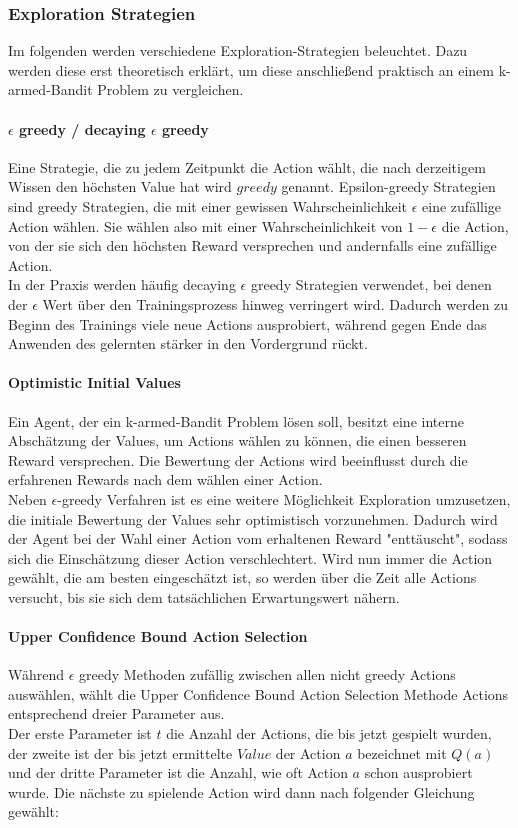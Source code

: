 \documentclass[11pt]{scrartcl}
\begin{document}
\subsubsection{Exploration Strategien}
Im folgenden werden verschiedene Exploration-Strategien beleuchtet. Dazu werden diese erst
theoretisch erklärt, um diese anschließend praktisch an einem k-armed-Bandit Problem zu
vergleichen.

\paragraph{$\epsilon$ greedy / decaying $\epsilon$ greedy}
Eine Strategie, die zu jedem Zeitpunkt die Action wählt, die nach derzeitigem Wissen den
höchsten Value hat wird $greedy$ genannt. Epsilon-greedy Strategien sind greedy
Strategien, die mit einer gewissen Wahrscheinlichkeit $\epsilon$ eine zufällige Action
wählen. Sie wählen also mit einer Wahrscheinlichkeit von $1 - \epsilon$ die Action, von
der sie sich den höchsten Reward versprechen und andernfalls eine zufällige Action.\\
In der Praxis werden häufig decaying $\epsilon$ greedy Strategien verwendet, bei denen der
$\epsilon$ Wert über den Trainingsprozess hinweg verringert wird. Dadurch werden zu Beginn
des Trainings viele neue Actions ausprobiert, während gegen Ende das Anwenden des
gelernten stärker in den Vordergrund rückt.

\paragraph{Optimistic Initial Values}
Ein Agent, der ein k-armed-Bandit Problem lösen soll, besitzt eine interne Abschätzung der
Values, um Actions wählen zu können, die einen besseren Reward versprechen. Die
Bewertung der Actions wird beeinflusst durch die erfahrenen Rewards nach dem wählen einer
Action.\\
Neben $\epsilon$-greedy Verfahren ist es eine weitere Möglichkeit Exploration umzusetzen,
die initiale Bewertung der Values sehr optimistisch vorzunehmen. Dadurch wird der Agent
bei der Wahl einer Action vom erhaltenen Reward "enttäuscht", sodass sich die Einschätzung
dieser Action verschlechtert. Wird nun immer die Action gewählt, die am besten
eingeschätzt ist, so werden über die Zeit alle Actions versucht, bis sie sich dem
tatsächlichen Erwartungswert nähern.

\paragraph{Upper Confidence Bound Action Selection}
Während $\epsilon$ greedy Methoden zufällig zwischen allen nicht greedy Actions
auswählen, wählt die Upper Confidence Bound Ac\-tion Selection Methode Actions entsprechend
dreier Parameter aus.\\
Der erste Parameter ist $t$ die Anzahl der Actions, die bis jetzt gespielt wurden, der
zweite ist der bis jetzt ermittelte $Value$ der Action $a$ bezeichnet mit $Q(a)$ und der
dritte Parameter ist die Anzahl, wie oft Action $a$ schon ausprobiert wurde. Die nächste
zu spielende Action wird dann nach folgender Gleichung gewählt:
\end{document}
